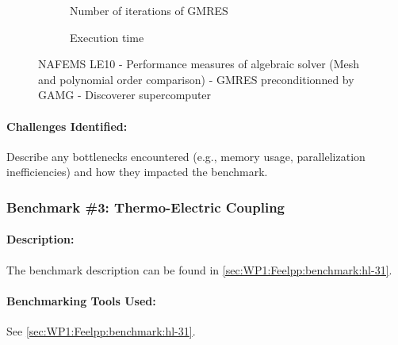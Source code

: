 \begin{figure}
  \begin{subfigure}[c]{\textwidth}
    \centering
    \caption{Number of iterations of GMRES}
  \end{subfigure}
  \begin{subfigure}[c]{\textwidth}
    \centering
    \caption{Execution time}
  \end{subfigure}
  \caption{NAFEMS LE10 - Performance measures of algebraic solver
    (Mesh and polynomial order comparison) - GMRES preconditionned by GAMG - Discoverer supercomputer}
\end{figure}


\paragraph{Challenges Identified:} Describe any bottlenecks encountered (e.g., memory usage, parallelization inefficiencies) and how they impacted the benchmark.


\subsubsection{Benchmark \#3: Thermo-Electric Coupling}
\label{sec:WP3:Feelpp:benchmark:hl-31}

\paragraph{Description:} %
The benchmark description can be found in
\cref{sec:WP1:Feelpp:benchmark:hl-31}.


\paragraph{Benchmarking Tools Used:} %
See \cref{sec:WP1:Feelpp:benchmark:hl-31}.

